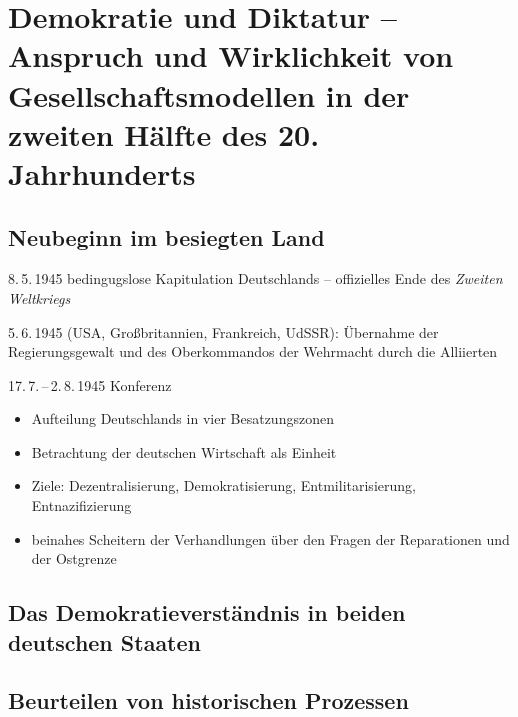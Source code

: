 \part{Demokratie und Diktatur -- Anspruch und Wirklichkeit von
Gesellschaftsmodellen in der zweiten Hälfte des 20. Jahrhunderts}
\label{prt:dem-dikt2}
\thispagestyle{empty}

\chapter{Neubeginn im besiegten Land}
\label{sec:neubeginn}

\begin{chronik}
\item[8.\,5.\,1945]
bedingugslose Kapitulation Deutschlands -- offizielles Ende des
\emph{Zweiten Weltkriegs} 

\item[5.\,6.\,1945]
  (USA,
Großbritannien, Frankreich, UdSSR): Übernahme der Regierungsgewalt und
des Oberkommandos der Wehrmacht durch die Alliierten

\item[17.\,7.\,--\,2.\,8.\,1945]
 Konferenz 
\begin{itemize}
\item Aufteilung Deutschlands in vier Besatzungszonen
\item Betrachtung der deutschen Wirtschaft als Einheit
\item Ziele: Dezentralisierung, Demokratisierung, Entmilitarisierung,
Entnazifizierung  
 
\item beinahes Scheitern der Verhandlungen über den Fragen der
Reparationen und der Ostgrenze
\end{itemize}
\end{chronik}





\chapter{Das Demokratieverständnis in beiden deutschen Staaten}
\label{chp:demverst-beid-staat}











\chapter{Beurteilen von historischen Prozessen}




\endinput
